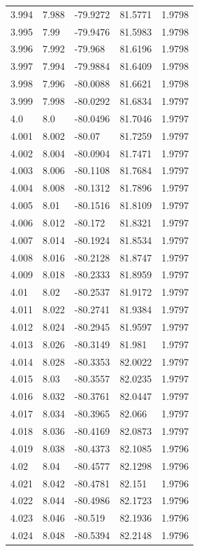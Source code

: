 \begin{tabular}{lllll}
3.994 & 7.988 & -79.9272 & 81.5771 & 1.9798 \\
3.995 & 7.99 & -79.9476 & 81.5983 & 1.9798 \\
3.996 & 7.992 & -79.968 & 81.6196 & 1.9798 \\
3.997 & 7.994 & -79.9884 & 81.6409 & 1.9798 \\
3.998 & 7.996 & -80.0088 & 81.6621 & 1.9798 \\
3.999 & 7.998 & -80.0292 & 81.6834 & 1.9797 \\
4.0 & 8.0 & -80.0496 & 81.7046 & 1.9797 \\
4.001 & 8.002 & -80.07 & 81.7259 & 1.9797 \\
4.002 & 8.004 & -80.0904 & 81.7471 & 1.9797 \\
4.003 & 8.006 & -80.1108 & 81.7684 & 1.9797 \\
4.004 & 8.008 & -80.1312 & 81.7896 & 1.9797 \\
4.005 & 8.01 & -80.1516 & 81.8109 & 1.9797 \\
4.006 & 8.012 & -80.172 & 81.8321 & 1.9797 \\
4.007 & 8.014 & -80.1924 & 81.8534 & 1.9797 \\
4.008 & 8.016 & -80.2128 & 81.8747 & 1.9797 \\
4.009 & 8.018 & -80.2333 & 81.8959 & 1.9797 \\
4.01 & 8.02 & -80.2537 & 81.9172 & 1.9797 \\
4.011 & 8.022 & -80.2741 & 81.9384 & 1.9797 \\
4.012 & 8.024 & -80.2945 & 81.9597 & 1.9797 \\
4.013 & 8.026 & -80.3149 & 81.981 & 1.9797 \\
4.014 & 8.028 & -80.3353 & 82.0022 & 1.9797 \\
4.015 & 8.03 & -80.3557 & 82.0235 & 1.9797 \\
4.016 & 8.032 & -80.3761 & 82.0447 & 1.9797 \\
4.017 & 8.034 & -80.3965 & 82.066 & 1.9797 \\
4.018 & 8.036 & -80.4169 & 82.0873 & 1.9797 \\
4.019 & 8.038 & -80.4373 & 82.1085 & 1.9796 \\
4.02 & 8.04 & -80.4577 & 82.1298 & 1.9796 \\
4.021 & 8.042 & -80.4781 & 82.151 & 1.9796 \\
4.022 & 8.044 & -80.4986 & 82.1723 & 1.9796 \\
4.023 & 8.046 & -80.519 & 82.1936 & 1.9796 \\
4.024 & 8.048 & -80.5394 & 82.2148 & 1.9796 \\

\end{tabular}
